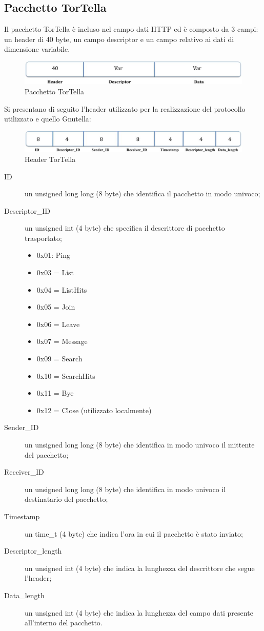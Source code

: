 \subsection{Pacchetto TorTella}
Il pacchetto TorTella è incluso nel campo dati HTTP ed è composto da 3 campi: un header di 40 byte, un campo descriptor e un campo relativo ai dati di dimensione variabile.
\begin{figure}[H]
\begin{center}
\includegraphics[scale=0.38]{etc/tortellapacket.jpg}
\caption{Pacchetto TorTella}
\label{tortellapacket}
\end{center}
\end{figure}
Si presentano di seguito l’header utilizzato per la realizzazione del protocollo utilizzato e quello Gnutella:
\begin{figure}[H]
\begin{center}
\includegraphics[scale=0.38]{etc/tortellaheader.jpg}
\caption{Header TorTella}
\label{tortellaheader}
\end{center}
\end{figure}
\begin{description}
\item[ID] un unsigned long long (8 byte) che identifica il pacchetto in modo univoco;
\item[Descriptor\_ID] un unsigned int (4 byte) che specifica il descrittore di pacchetto trasportato;
\begin{itemize}
	\item 0x01: Ping
	\item 0x03 = List
	\item 0x04 = ListHits
	\item 0x05 = Join
	\item 0x06 = Leave
	\item 0x07 = Message
	\item 0x09 = Search
	\item 0x10 = SearchHits
	\item 0x11 = Bye
	\item 0x12 = Close (utilizzato localmente)
\end{itemize}
\item[Sender\_ID] un unsigned long long (8 byte) che identifica in modo univoco il mittente del pacchetto;
\item[Receiver\_ID] un unsigned long long (8 byte) che identifica in modo univoco il destinatario del pacchetto;
\item[Timestamp] un time\_t (4 byte) che indica l’ora in cui il pacchetto è stato inviato;
\item[Descriptor\_length] un unsigned int (4 byte) che indica la lunghezza del descrittore che segue l’header;
\item[Data\_length] un unsigned int (4 byte) che indica la lunghezza del campo dati presente all’interno del pacchetto.
\end{description}
